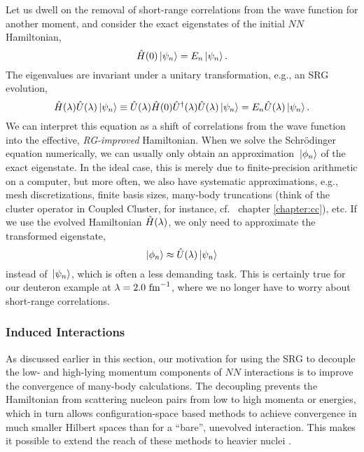 Let us dwell on the removal of short-range correlations from
the wave function for another moment, and consider the exact eigenstates of
the initial $NN$ Hamiltonian, 
\begin{equation}
  \hat{H}(0) \,|{\psi_n}\rangle = E_n \,|{\psi_n}\rangle\,.
\end{equation}
The eigenvalues are invariant under a unitary transformation, e.g.,
an SRG evolution,
\begin{equation}
  \hat{H}(\lambda)\hat{U}(\lambda)\,|{\psi_n}\rangle \equiv \hat{U}(\lambda) \hat{H}(0) \hat{U}^\dag(\lambda) \hat{U}(\lambda)\,|{\psi_n}\rangle 
    = E_n \hat{U}(\lambda) \,|{\psi_n}\rangle\,.
\end{equation}
We can interpret this equation as a shift of correlations from the
wave function into the effective, \emph{RG-improved} Hamiltonian. When
we solve the Schr\"odinger equation numerically, we can usually only
obtain an approximation $\,|{\phi_n}\rangle$ of the exact eigenstate. In 
the ideal case, this is merely due to finite-precision arithmetic on
a computer, but more often, we also have systematic approximations,
e.g., mesh discretizations, finite basis sizes, many-body truncations 
(think of the cluster operator in Coupled Cluster, for instance, cf.~
chapter \ref{chapter:cc}), etc.
If we use the evolved Hamiltonian $\hat{H}(\lambda)$, we only need 
to approximate the transformed eigenstate,
\begin{equation}\label{eq:approx_eigenstate}
  \ket{\phi_n}\approx\UO(\lambda)\ket{\psi_n}\,
\end{equation}
instead of $\,|{\psi_n}\rangle$, which is often a less demanding task.
This is certainly true for our deuteron example at $\lambda=2.0\,\,\text{fm}^{-1}$,
where we no longer have to worry about short-range correlations.

%
%
\subsubsection{\label{sec:srg_induced}Induced Interactions}

As discussed earlier in this section, our motivation for using the SRG to
decouple the low- and high-lying momentum components of $NN$ interactions 
is to improve the convergence of many-body calculations. The decoupling 
prevents the Hamiltonian from scattering nucleon pairs from low to high 
momenta or energies, which in turn allows configuration-space based methods 
to achieve convergence in much smaller Hilbert spaces than for a ``bare'',
unevolved interaction. This makes it possible to extend the reach of these
methods to heavier nuclei \cite{Roth:2011kx,Barrett:2013oq,Jurgenson:2013fk,Roth:2014fk,Hergert:2013ij,Hergert:2013mi,Hergert:2014vn,Hergert:2016jk,Hagen:2010uq,Roth:2012qf,Binder:2013zr,Binder:2014fk,Soma:2011vn,Soma:2013ys,Soma:2014fu,Soma:2014eu}.

